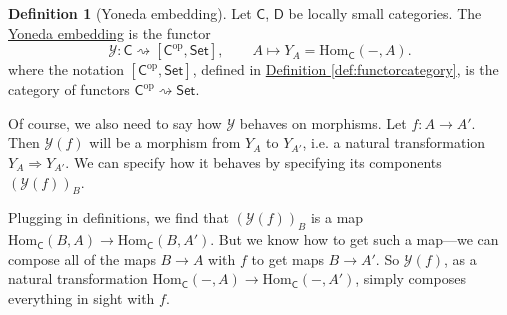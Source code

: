\documentclass[a4paper]{report}
\newcommand{\defn}[1]{\ul{#1}}
\newcommand{\Hom}{\mathrm{Hom}}
\theoremstyle{definition}
\newtheorem{definition}{Definition}[section]
\theoremstyle{plain}
\theoremstyle{remark}
\begin{document}
\begin{definition}[Yoneda embedding]
  \label{def:yonedaembedding}
  Let $\mathsf{C}$, $\mathsf{D}$ be locally small categories. The \defn{Yoneda embedding} is the functor
  \begin{equation*}
    \mathcal{Y}\colon \mathsf{C} \rightsquigarrow [\mathsf{C}^{\mathrm{op}}, \mathsf{Set}], \qquad A \mapsto Y_{A} = \Hom_{\mathsf{C}}(-, A).
  \end{equation*}
  where the notation $[\mathsf{C}^{\mathrm{op}}, \mathsf{Set}]$, defined in \hyperref[def:functorcategory]{Definition \ref*{def:functorcategory}}, is the category of functors $\mathsf{C}^{\mathrm{op}} \rightsquigarrow \mathsf{Set}$.

  Of course, we also need to say how $\mathcal{Y}$ behaves on morphisms. Let $f\colon A \to A'$. Then $\mathcal{Y}(f)$ will be a morphism from $Y_{A}$ to $Y_{A'}$, i.e. a natural transformation $Y_{A} \Rightarrow Y_{A'}$. We can specify how it behaves by specifying its components $(\mathcal{Y}(f))_{B}$. 

  Plugging in definitions, we find that $(\mathcal{Y}(f))_{B}$ is a map $\Hom_{\mathsf{C}}(B, A) \to \Hom_{\mathsf{C}}(B, A')$. But we know how to get such a map---we can compose all of the maps $B \to A$ with $f$ to get maps $B \to A'$. So $\mathcal{Y}(f)$, as a natural transformation $\Hom_{\mathsf{C}}(-, A) \to \Hom_{\mathsf{C}}(-, A')$, simply composes everything in sight with $f$.
\end{definition}
\end{document}
